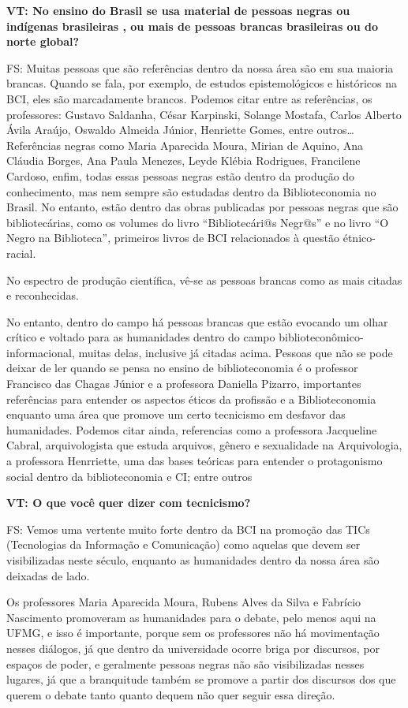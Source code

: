 \documentclass[a4paper,
fontsize=11pt,
oneside,
numbers=noperiodatend,
parskip=half-,
bibliography=totoc,
final
]{scrartcl}
\begin{document}
\textbf{VT: No ensino do Brasil se usa material de pessoas negras ou
indígenas brasileiras , ou mais de pessoas brancas brasileiras ou do
norte global?}

FS: Muitas pessoas que são referências dentro da nossa área são em sua
maioria brancas. Quando se fala, por exemplo, de estudos epistemológicos
e históricos na BCI, eles são marcadamente brancos. Podemos citar entre
as referências, os professores: Gustavo Saldanha, César Karpinski,
Solange Mostafa, Carlos Alberto Ávila Araújo, Oswaldo Almeida Júnior,
Henriette Gomes, entre outros\ldots{} Referências negras como Maria
Aparecida Moura, Mirian de Aquino, Ana Cláudia Borges, Ana Paula
Menezes, Leyde Klébia Rodrigues, Francilene Cardoso, enfim, todas essas
pessoas negras estão dentro da produção do conhecimento, mas nem sempre
são estudadas dentro da Biblioteconomia no Brasil. No entanto, estão
dentro das obras publicadas por pessoas negras que são bibliotecárias,
como os volumes do livro \enquote{Bibliotecári@s Negr@s} e no livro
\enquote{O Negro na Biblioteca}, primeiros livros de BCI relacionados à
questão étnico-racial.

No espectro de produção científica, vê-se as pessoas brancas como as
mais citadas e reconhecidas.

No entanto, dentro do campo há pessoas brancas que estão evocando um
olhar crítico e voltado para as humanidades dentro do campo
biblioteconômico-informacional, muitas delas, inclusive já citadas
acima. Pessoas que não se pode deixar de ler quando se pensa no ensino
de biblioteconomia é o professor Francisco das Chagas Júnior e a
professora Daniella Pizarro, importantes referências para entender os
aspectos éticos da profissão e a Biblioteconomia enquanto uma área que
promove um certo tecnicismo em desfavor das humanidades. Podemos citar
ainda, referencias como a professora Jacqueline Cabral, arquivologista
que estuda arquivos, gênero e sexualidade na Arquivologia, a professora
Henrriette, uma das bases teóricas para entender o protagonismo social
dentro da biblioteconomia e CI; entre outros

\textbf{VT: O que você quer dizer com tecnicismo?}

FS: Vemos uma vertente muito forte dentro da BCI na promoção das TICs
(Tecnologias da Informação e Comunicação) como aquelas que devem ser
visibilizadas neste século, enquanto as humanidades dentro da nossa área
são deixadas de lado.

Os professores Maria Aparecida Moura, Rubens Alves da Silva e Fabrício
Nascimento promoveram as humanidades para o debate, pelo menos aqui na
UFMG, e isso é importante, porque sem os professores não há movimentação
nesses diálogos, já que dentro da universidade ocorre briga por
discursos, por espaços de poder, e geralmente pessoas negras não são
visibilizadas nesses lugares, já que a branquitude também se promove a
partir dos discursos dos que querem o debate tanto quanto dequem não
quer seguir essa direção.
\end{document}
